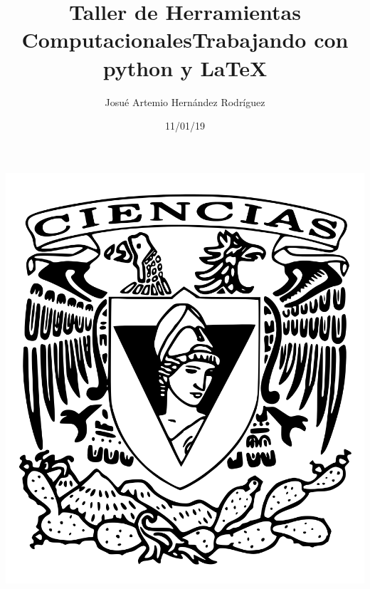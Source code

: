 \documentclass[letterpaper, 12pt, oneside]{article}%
\title{\Huge Taller de Herramientas Computacionales}
\author{Josué Artemio Hernández Rodríguez}%
\date{11/01/19}%
\begin{document}
\maketitle
\begin{center}%
\includegraphics[scale=0.2]{2.png}%
\end{center}%
\newpage%

\title{\Huge Trabajando con python y LaTeX\\}%
\end{document}
